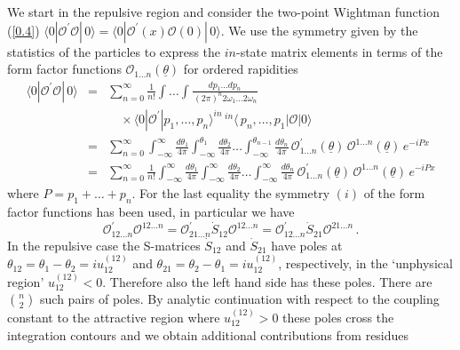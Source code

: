 \documentclass[a4paper,a4paper]{article}
\begin{document}
We start in the repulsive region and consider the two-point Wightman
function (\ref{0.4}) $\langle 0|\mathcal{O}^{\prime }\mathcal{O}|\,0\rangle
=\langle 0|\mathcal{O}^{\prime }(x)\mathcal{O}(0)|\,0\rangle $. We use the
symmetry given by the statistics of the particles to express the $in$-state
matrix elements in terms of the form factor functions $\mathcal{O}_{1\dots
n}(\underline{\theta })$ for ordered rapidities 
\begin{eqnarray*}
\langle 0|\mathcal{O}^{\prime }\mathcal{O}|\,0\rangle &=&\sum_{n=0}^{\infty }%
\frac{1}{n!}\int \dots \int \frac{dp_{1}\ldots dp_{n}}{\,(2\pi )^{n}2\omega
_{1}\dots 2\omega _{n}} \\
&&\quad \times \langle 0|\mathcal{O}^{\prime }|p_{1},\ldots ,p_{n}\rangle
^{in}\,^{in}\langle \,p_{n},\ldots ,p_{1}|\mathcal{O}|0\rangle \\
&=&\sum_{n=0}^{\infty }\int_{-\infty }^{\infty }\frac{d\theta _{1}}{4\pi }%
\int_{-\infty }^{\theta _{1}}\frac{d\theta _{2}}{4\pi }\dots \int_{-\infty
}^{\theta _{n-1}}\frac{d\theta _{n}}{4\pi }\,\mathcal{O}_{1\dots n}^{\prime
}(\underline{\theta })\,\mathcal{O}^{1\dots n}(\underline{\theta })\,e^{-iPx}
\\
&=&\sum_{n=0}^{\infty }\frac{1}{n!}\int_{-\infty }^{\infty }\frac{d\theta
_{1}}{4\pi }\int_{-\infty }^{\infty }\frac{d\theta _{2}}{4\pi }\dots
\int_{-\infty }^{\infty }\frac{d\theta _{n}}{4\pi }\,\mathcal{O}_{1\dots
n}^{\prime }(\underline{\theta })\,\mathcal{O}^{1\dots n}(\underline{\theta }%
)\,e^{-iPx}
\end{eqnarray*}
where $P=p_{1}+\dots +p_{n}$. For the last equality the symmetry $(i)$ of
the form factor functions has been used, in particular we have 
\begin{equation}
\mathcal{O}_{12\dots n}^{\prime }\mathcal{O}^{12\dots n}=\mathcal{O}%
_{21\dots n}^{\prime }\dot{S}_{12}\mathcal{O}^{12\dots n}=\mathcal{O}%
_{12\dots n}^{\prime }\dot{S}_{21}\mathcal{O}^{21\dots n}\,.  \label{b1.80}
\end{equation}
In the repulsive case the S-matrices $\dot{S}_{12}$ and $\dot{S}_{21}$ have
poles at $\theta _{12}=\theta _{1}-\theta _{2}=iu_{12}^{(12)}$ and $\theta
_{21}=\theta _{2}-\theta _{1}=iu_{12}^{(12)}$, respectively, in the
`unphysical region' $u_{12}^{(12)}<0$. Therefore also the left hand side has
these poles. There are $\binom{n}{2}$ such pairs of poles. By analytic
continuation with respect to the coupling constant to the attractive region
where $u_{12}^{(12)}>0$ these poles cross the integration contours and we
obtain additional contributions from residues 
\end{document}

